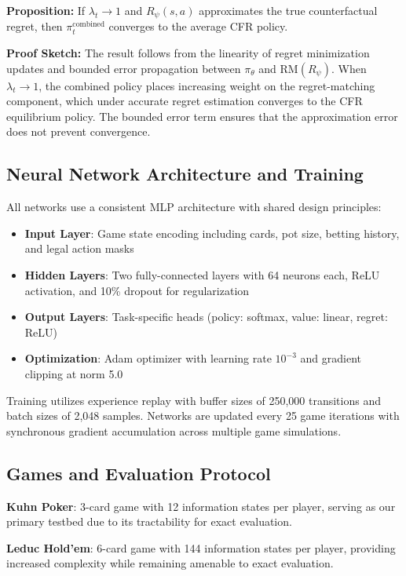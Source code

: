 \documentclass{icml2024}
\begin{document}
\textbf{Proposition:} If $\lambda_t \to 1$ and $R_\psi(s,a)$ approximates the true counterfactual regret, then $\pi^{\text{combined}}_t$ converges to the average CFR policy.

\textbf{Proof Sketch:} The result follows from the linearity of regret minimization updates and bounded error propagation between $\pi_\theta$ and $\text{RM}(R_\psi)$. When $\lambda_t \to 1$, the combined policy places increasing weight on the regret-matching component, which under accurate regret estimation converges to the CFR equilibrium policy. The bounded error term ensures that the approximation error does not prevent convergence.

\subsection{Neural Network Architecture and Training}

All networks use a consistent MLP architecture with shared design principles:
\begin{itemize}
\item \textbf{Input Layer}: Game state encoding including cards, pot size, betting history, and legal action masks
\item \textbf{Hidden Layers}: Two fully-connected layers with 64 neurons each, ReLU activation, and 10\% dropout for regularization
\item \textbf{Output Layers}: Task-specific heads (policy: softmax, value: linear, regret: ReLU)
\item \textbf{Optimization}: Adam optimizer with learning rate $10^{-3}$ and gradient clipping at norm 5.0
\end{itemize}

Training utilizes experience replay with buffer sizes of 250,000 transitions and batch sizes of 2,048 samples. Networks are updated every 25 game iterations with synchronous gradient accumulation across multiple game simulations.

\subsection{Games and Evaluation Protocol}

\textbf{Kuhn Poker}: 3-card game with 12 information states per player, serving as our primary testbed due to its tractability for exact evaluation.

\textbf{Leduc Hold'em}: 6-card game with 144 information states per player, providing increased complexity while remaining amenable to exact evaluation.
\end{document}
